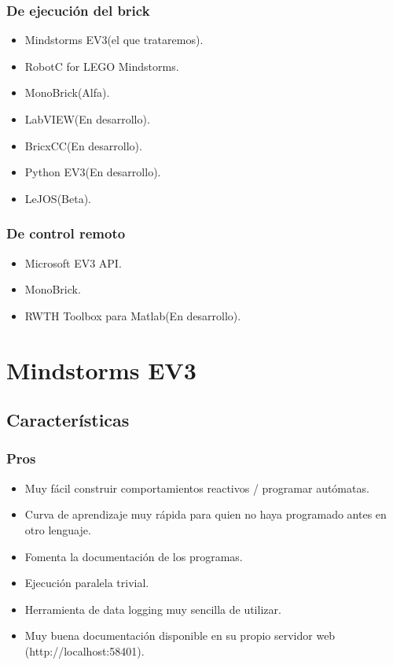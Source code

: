 \documentclass[12pt,a4paper]{article}
\begin{document}
\subsubsection{De ejecución del brick}

\begin{itemize}
\item Mindstorms EV3(el que trataremos).
\item RobotC for LEGO Mindstorms.
\item MonoBrick(Alfa).
\item LabVIEW(En desarrollo).
\item BricxCC(En desarrollo).
\item Python EV3(En desarrollo).
\item LeJOS(Beta).
\end{itemize}

\subsubsection{De control remoto}

\begin{itemize}
\item Microsoft EV3 API.
\item MonoBrick.
\item RWTH Toolbox para Matlab(En desarrollo).
\end{itemize}


\section{Mindstorms EV3}

\subsection{Características}

\subsubsection{Pros}

\begin{itemize}
\item Muy fácil construir comportamientos reactivos / programar autómatas.
\item Curva de aprendizaje muy rápida para quien no haya programado antes en
otro lenguaje.
\item Fomenta la documentación de los programas.
\item Ejecución paralela trivial.
\item Herramienta de data logging muy sencilla de utilizar.
\item Muy buena documentación disponible en su propio servidor web
(http://localhost:58401).
\end{itemize}
\end{document}
